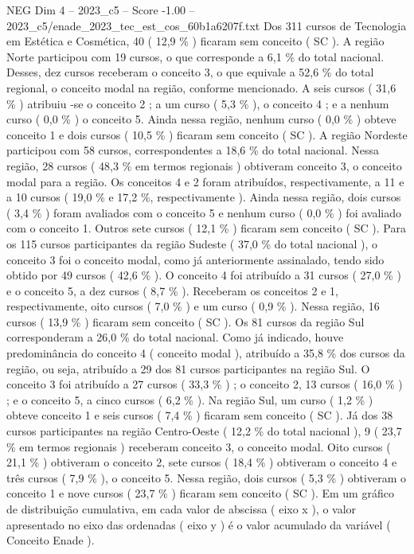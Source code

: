 \begin{textsample}{NEG Dim 4 – 2023\_c5 – Score -1.00 – 2023\_c5/enade\_2023\_tec\_est\_cos\_60b1a6207f.txt}
Dos 311 cursos de Tecnologia em Estética e Cosmética, 40 ( 12,9 \% ) ficaram sem conceito ( SC ).
A região Norte participou com 19 cursos, o que corresponde a 6,1 \% do total nacional.
Desses, dez cursos receberam o conceito 3, o que equivale a 52,6 \% do total regional, o conceito modal na região, conforme mencionado.
A seis cursos ( 31,6 \% ) atribuiu -se o conceito 2 ; a um curso ( 5,3 \% ), o conceito 4 ; e a nenhum curso ( 0,0 \% ) o conceito 5.
Ainda nessa região, nenhum curso ( 0,0 \% ) obteve conceito 1 e dois cursos ( 10,5 \% ) ficaram sem conceito ( SC ).
A região Nordeste participou com 58 cursos, correspondentes a 18,6 \% do total nacional.
Nessa região, 28 cursos ( 48,3 \% em termos regionais ) obtiveram conceito 3, o conceito modal para a região.
Os conceitos 4 e 2 foram atribuídos, respectivamente, a 11 e a 10 cursos ( 19,0 \% e 17,2 \%, respectivamente ).
Ainda nessa região, dois cursos ( 3,4 \% ) foram avaliados com o conceito 5 e nenhum curso ( 0,0 \% ) foi avaliado com o conceito 1.
Outros sete cursos ( 12,1 \% ) ficaram sem conceito ( SC ).
Para os 115 cursos participantes da região Sudeste ( 37,0 \% do total nacional ), o conceito 3 foi o conceito modal, como já anteriormente assinalado, tendo sido obtido por 49 cursos ( 42,6 \% ).
O conceito 4 foi atribuído a 31 cursos ( 27,0 \% ) e o conceito 5, a dez cursos ( 8,7 \% ).
Receberam os conceitos 2 e 1, respectivamente, oito cursos ( 7,0 \% ) e um curso ( 0,9 \% ).
Nessa região, 16 cursos ( 13,9 \% ) ficaram sem conceito ( SC ).
Os 81 cursos da região Sul corresponderam a 26,0 \% do total nacional.
Como já indicado, houve predominância do conceito 4 ( conceito modal ), atribuído a 35,8 \% dos cursos da região, ou seja, atribuído a 29 dos 81 cursos participantes na região Sul.
O conceito 3 foi atribuído a 27 cursos ( 33,3 \% ) ; o conceito 2, 13 cursos ( 16,0 \% ) ; e o conceito 5, a cinco cursos ( 6,2 \% ).
Na região Sul, um curso ( 1,2 \% ) obteve conceito 1 e seis cursos ( 7,4 \% ) ficaram sem conceito ( SC ).
Já dos 38 cursos participantes na região Centro-Oeste ( 12,2 \% do total nacional ), 9 ( 23,7 \% em termos regionais ) receberam conceito 3, o conceito modal.
Oito cursos ( 21,1 \% ) obtiveram o conceito 2, sete cursos ( 18,4 \% ) obtiveram o conceito 4 e três cursos ( 7,9 \% ), o conceito 5.
Nessa região, dois cursos ( 5,3 \% ) obtiveram o conceito 1 e nove cursos ( 23,7 \% ) ficaram sem conceito ( SC ).
Em um gráfico de distribuição cumulativa, em cada valor de abscissa ( eixo x ), o valor apresentado no eixo das ordenadas ( eixo y ) é o valor acumulado da variável ( Conceito Enade ).

\end{textsample}
